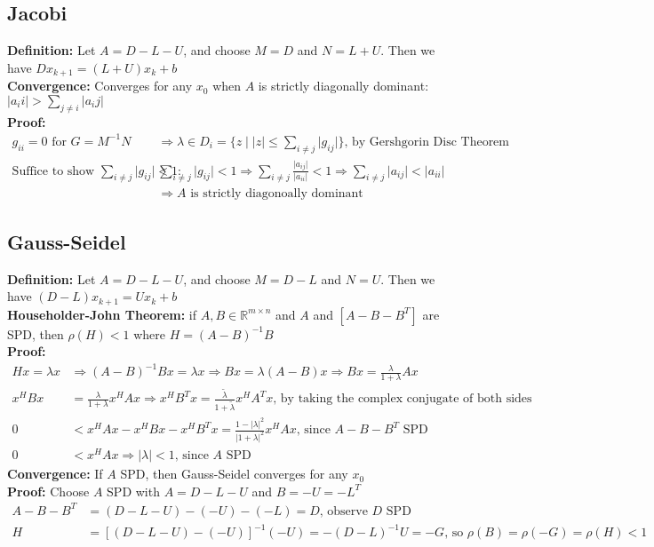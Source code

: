 \documentclass{article}
\newcommand{\abs}[1]{\lvert#1\rvert}
\begin{document}
\subsection{Jacobi}
\textbf{Definition: }Let $A = D - L - U$, and choose $M = D$ and $N = L+U$. Then we have $Dx_{k+1} = (L+U)x_k + b$\\
\textbf{Convergence: }Converges for any $x_0$ when $A$ is strictly diagonally dominant: $\abs{a_ii} > \sum_{j\neq i} \abs{a_ij}$\\
\textbf{Proof: }
\begin{align*}
    g_{ii} = 0 \textrm{ for } G = M^{-1}N &\Longrightarrow \lambda \in D_i = \{ z \mid \abs{z} \leq \sum_{i\neq j}\abs{g_{ij}}\} \textrm{, by Gershgorin Disc Theorem}\\
    \textrm{Suffice to show } \sum_{i\neq j}\abs{g_{ij}} < 1: \; \;& \sum_{i\neq j}\abs{g_{ij}} < 1 \Longrightarrow \sum_{i\neq j} \frac{\abs{a_{ij}}}{\abs{a_{ii}}} <1 \Longrightarrow \sum_{i\neq j}\abs{a_{ij}} < \abs{a_{ii}}\\
    &\Longrightarrow \textrm{$A$ is strictly diagonoally dominant}
\end{align*}

\subsection{Gauss-Seidel}
\textbf{Definition: } Let $A = D - L - U$, and choose $M = D - L$ and $N = U$. Then we have $(D - L)x_{k+1} = Ux_k + b$\\
\textbf{Householder-John Theorem: } if $A, B \in \mathbb{R}^{m \times n}$ and $A$ and $[A - B - B^T]$ are SPD, then $\rho(H) < 1$ where $H = (A - B)^{-1}B$\\
\textbf{Proof:}
\begin{align*}
    Hx = \lambda x &\Longrightarrow (A - B)^{-1}Bx = \lambda x \Longrightarrow Bx = \lambda (A - B)x \Longrightarrow Bx = \frac{\lambda}{1 + \lambda}Ax\\
    x^HBx &= \frac{\lambda}{1 + \lambda}x^HAx \Longrightarrow x^HB^Tx = \frac{\tilde{\lambda}}{1 + \tilde{\lambda}}x^HA^Tx \textrm{, by taking the complex conjugate of both sides}\\
    0 &< x^HAx - x^HBx - x^HB^Tx = \frac{1 - \abs{\lambda}^2}{\abs{1 + \lambda}^2}x^HAx \textrm{, since $A-B-B^T$ SPD}\\
    0 &< x^HAx \Longrightarrow \abs{\lambda}<1 \textrm{, since $A$ SPD}
\end{align*}
\textbf{Convergence: } If $A$ SPD, then Gauss-Seidel converges for any $x_0$\\
\textbf{Proof:}
Choose $A$ SPD with $A = D - L - U$ and $B = -U = -L^T$
\begin{align*}
    A - B - B^T &= (D - L - U) - (-U) - (-L) = D \textrm{, observe $D$ SPD}\\
    H &= [(D - L - U) - (-U)]^{-1}(-U) = -(D - L)^{-1}U = -G \textrm{, so } \rho(B) = \rho(-G) = \rho(H) < 1
\end{align*}
\end{document}
